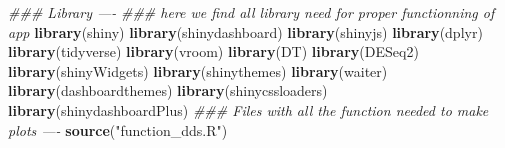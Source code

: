 \documentclass[
  12pt,
]{article}
\newenvironment{Shaded}{\begin{snugshade}}{\end{snugshade}}
\newcommand{\CommentTok}[1]{\textcolor[rgb]{0.56,0.35,0.01}{\textit{#1}}}
\newcommand{\KeywordTok}[1]{\textcolor[rgb]{0.13,0.29,0.53}{\textbf{#1}}}
\newcommand{\NormalTok}[1]{#1}
\newcommand{\StringTok}[1]{\textcolor[rgb]{0.31,0.60,0.02}{#1}}
\begin{document}
\begin{Shaded}
\begin{Highlighting}[]
\CommentTok{### Library ----}
\CommentTok{### here we find all library need for proper functionning of app}
\KeywordTok{library}\NormalTok{(shiny)}
\KeywordTok{library}\NormalTok{(shinydashboard)}
\KeywordTok{library}\NormalTok{(shinyjs)}
\KeywordTok{library}\NormalTok{(dplyr)}
\KeywordTok{library}\NormalTok{(tidyverse)}
\KeywordTok{library}\NormalTok{(vroom)}
\KeywordTok{library}\NormalTok{(DT)}
\KeywordTok{library}\NormalTok{(DESeq2)}
\KeywordTok{library}\NormalTok{(shinyWidgets)}
\KeywordTok{library}\NormalTok{(shinythemes)}
\KeywordTok{library}\NormalTok{(waiter)}
\KeywordTok{library}\NormalTok{(dashboardthemes)}
\KeywordTok{library}\NormalTok{(shinycssloaders)}
\KeywordTok{library}\NormalTok{(shinydashboardPlus)}
\CommentTok{### Files with all the function needed to make plots ----}
\KeywordTok{source}\NormalTok{(}\StringTok{"function_dds.R"}\NormalTok{)}


\end{Highlighting}
\end{Shaded}
\end{document}

